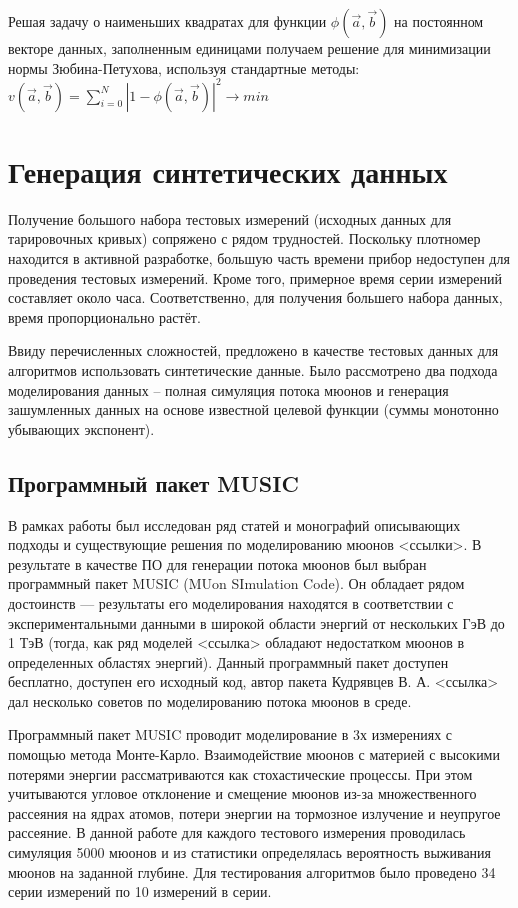 Решая задачу о наименьших квадратах для функции 
$\phi(\vec{a}, \vec{b})$ на постоянном векторе данных, заполненным
единицами получаем решение для минимизации нормы 
Зюбина-Петухова, используя стандартные методы: 
$v(\vec{a}, \vec{b}) = \displaystyle\sum_{i=0}^N \left|1 -
\phi(\vec{a}, \vec{b})\right|^2 \rightarrow min$


\section{Генерация синтетических данных}\label{sect2_3}


Получение большого набора тестовых измерений (исходных данных 
для тарировочных кривых) сопряжено с рядом трудностей. Поскольку 
плотномер находится в активной разработке,
большую часть времени прибор недоступен для проведения тестовых
измерений. Кроме того, примерное время серии измерений составляет
около часа. Соответственно, для получения большего набора данных, время пропорционально растёт.


Ввиду перечисленных сложностей, предложено в качестве тестовых
данных для алгоритмов использовать синтетические данные. Было 
рассмотрено два подхода моделирования данных -- 
полная симуляция потока мюонов и генерация зашумленных данных 
на основе известной целевой функции (суммы монотонно убывающих экспонент).


\subsection{Программный пакет MUSIC}\label{subsect2_3_1}


В рамках работы был исследован ряд статей и монографий описывающих подходы и существующие
решения по моделированию мюонов <ссылки>. В результате в качестве ПО для 
генерации потока мюонов
был выбран программный пакет MUSIC (MUon SImulation Code). Он обладает
рядом достоинств --- 
результаты его моделирования находятся в соответствии с экспериментальными
данными в широкой области энергий от нескольких ГэВ до 1 ТэВ (тогда, как ряд
моделей <ссылка> обладают
недостатком мюонов в определенных областях энергий). Данный программный 
пакет доступен бесплатно, доступен его исходный код, автор пакета
Кудрявцев В. А. <ссылка> дал несколько 
советов по моделированию потока мюонов в среде.


Программный пакет MUSIC проводит моделирование в 3х измерениях с помощью 
метода Монте-Карло. Взаимодействие мюонов с материей с высокими
потерями энергии рассматриваются как стохастические процессы. При этом учитываются угловое отклонение 
и смещение мюонов из-за множественного рассеяния на ядрах атомов, 
потери энергии на тормозное излучение
и неупругое рассеяние. В данной работе для каждого тестового измерения 
проводилась симуляция 5000 мюонов и из статистики определялась вероятность
выживания мюонов на заданной глубине. 
Для тестирования алгоритмов было проведено 34 серии измерений по 10 измерений в серии. 


